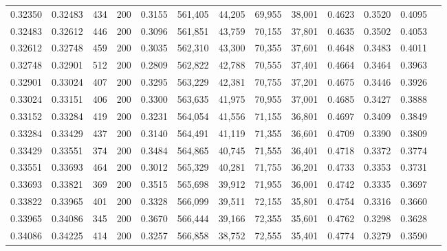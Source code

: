 \begin{tabular}{rrrrrrrrrrrrr}
0.32350 & 0.32483 &    434 & 200 &                                     0.3155 & 561,405 &  44,205 &  69,955 &  38,001 & 0.4623 & 0.3520 & 0.4095 \\
0.32483 & 0.32612 &    446 & 200 &                                     0.3096 & 561,851 &  43,759 &  70,155 &  37,801 & 0.4635 & 0.3502 & 0.4053 \\
0.32612 & 0.32748 &    459 & 200 &                                     0.3035 & 562,310 &  43,300 &  70,355 &  37,601 & 0.4648 & 0.3483 & 0.4011 \\
0.32748 & 0.32901 &    512 & 200 &                                     0.2809 & 562,822 &  42,788 &  70,555 &  37,401 & 0.4664 & 0.3464 & 0.3963 \\
0.32901 & 0.33024 &    407 & 200 &                                     0.3295 & 563,229 &  42,381 &  70,755 &  37,201 & 0.4675 & 0.3446 & 0.3926 \\
0.33024 & 0.33151 &    406 & 200 &                                     0.3300 & 563,635 &  41,975 &  70,955 &  37,001 & 0.4685 & 0.3427 & 0.3888 \\
0.33152 & 0.33284 &    419 & 200 &                                     0.3231 & 564,054 &  41,556 &  71,155 &  36,801 & 0.4697 & 0.3409 & 0.3849 \\
0.33284 & 0.33429 &    437 & 200 &                                     0.3140 & 564,491 &  41,119 &  71,355 &  36,601 & 0.4709 & 0.3390 & 0.3809 \\
0.33429 & 0.33551 &    374 & 200 &                                     0.3484 & 564,865 &  40,745 &  71,555 &  36,401 & 0.4718 & 0.3372 & 0.3774 \\
0.33551 & 0.33693 &    464 & 200 &                                     0.3012 & 565,329 &  40,281 &  71,755 &  36,201 & 0.4733 & 0.3353 & 0.3731 \\
0.33693 & 0.33821 &    369 & 200 &                                     0.3515 & 565,698 &  39,912 &  71,955 &  36,001 & 0.4742 & 0.3335 & 0.3697 \\
0.33822 & 0.33965 &    401 & 200 &                                     0.3328 & 566,099 &  39,511 &  72,155 &  35,801 & 0.4754 & 0.3316 & 0.3660 \\
0.33965 & 0.34086 &    345 & 200 &                                     0.3670 & 566,444 &  39,166 &  72,355 &  35,601 & 0.4762 & 0.3298 & 0.3628 \\
0.34086 & 0.34225 &    414 & 200 &                                     0.3257 & 566,858 &  38,752 &  72,555 &  35,401 & 0.4774 & 0.3279 & 0.3590 \\

\end{tabular}
